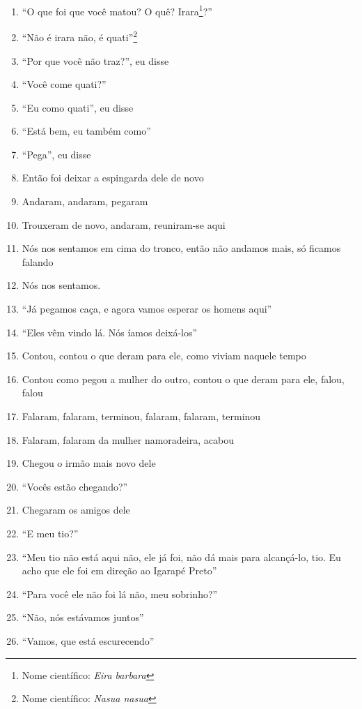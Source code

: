 \begin{enumerate}
 \item ``O que foi que você matou? O quê? Irara\footnote{Nome científico:
   \textit{Eira barbara}}?''
 \item ``Não é irara não, é quati''\footnote{Nome científico: \textit{Nasua
   nasua}}
 \item ``Por que você não traz?'', eu disse
 \item ``Você come quati?''
 \item ``Eu como quati'', eu disse
 \item ``Está bem, eu também como''
 \item ``Pega'', eu disse
 \item Então foi deixar a espingarda dele de novo
 \begin{center}\end{center}
 \item Andaram, andaram, pegaram
 \item Trouxeram de novo, andaram, reuniram-se aqui
 \item Nós nos sentamos em cima do tronco, então não andamos mais, só
 ficamos falando
 \item Nós nos sentamos.
 \item ``Já pegamos caça, e agora vamos esperar os homens aqui''
 \item ``Eles vêm vindo lá. Nós íamos deixá-los''
 \item Contou, contou o que deram para ele, como viviam naquele tempo
 \item Contou como pegou a mulher do outro, contou o que deram para ele,
 falou, falou
 \item Falaram, falaram, terminou, falaram, falaram, terminou
 \item Falaram, falaram da mulher namoradeira, acabou
 \begin{center}\end{center}
 \item Chegou o irmão mais novo dele
 \item ``Vocês estão chegando?''
 \item Chegaram os amigos dele
 \item ``E meu tio?''
 \item ``Meu tio não está aqui não, ele já foi, não dá mais para
 alcançá-lo, tio. Eu acho que ele foi em direção ao Igarapé Preto''
 \item ``Para você ele não foi lá não, meu sobrinho?''
 \item ``Não, nós estávamos juntos''
 \item ``Vamos, que está escurecendo''

\end{enumerate}
